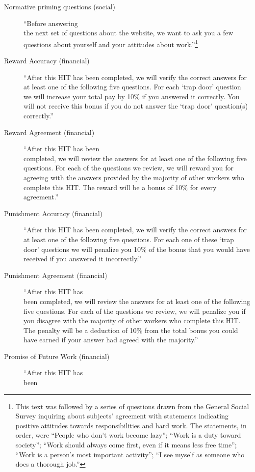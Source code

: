 \documentclass{cscw2010}
\begin{document}
\begin{description}
\item[Normative priming questions (social)] ``Before answering \\the next
  set of questions about the website, we want to ask you a few
  questions about yourself and your attitudes about
  work.''\footnote{This text was followed by a series of questions drawn from the General Social Survey inquiring about subjects' agreement with statements indicating positive attitudes towards responsibilities and hard work. The statements, in order, were ``People who don't work become lazy''; ``Work is a duty toward society''; ``Work should always come first, even if it means less free time''; ``Work is a person's most important activity''; ``I see myself as someone who does a thorough job.''}
\item[Reward Accuracy (financial)] ``After this HIT has been completed,
  we will verify the correct answers for at least one of the following
  five questions. For each `trap door' question we will increase your
  total pay by 10\% if you answered it correctly. You will not receive
  this bonus if you do not answer the `trap door' question(s)
  correctly.''
\item[Reward Agreement (financial)] ``After this HIT has been\\
  completed, we will review the answers for at least one of the
  following five questions. For each of the questions we review, we
  will reward you for agreeing with the answers provided by the
  majority of other workers who complete this HIT. The reward will be
  a bonus of 10\% for every agreement.''
\item[Punishment Accuracy (financial)] ``After this HIT has been
  completed, we will verify the correct answers for at least one of
  the following five questions. For each one of these `trap door'
  questions we will penalize you 10\% of the bonus that you would have
  received if you answered it incorrectly.''
\item[Punishment Agreement (financial)] ``After this HIT has\\ been
  completed, we will review the answers for at least one of the
  following five questions. For each of the questions we review, we
  will penalize you if you disagree with the majority of other workers
  who complete this HIT. The penalty will be a deduction of 10\% from
  the total bonus you could have earned if your answer had agreed with
  the majority.''
\item[Promise of Future Work (financial)] ``After this HIT has \\been

\end{description}
\end{document}
